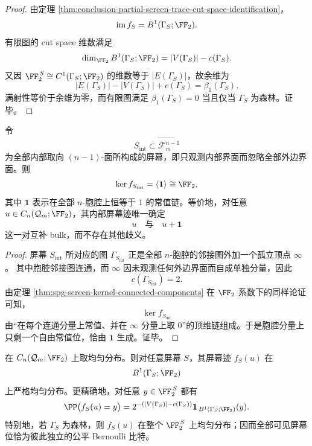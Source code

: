 \begin{proof}
由定理 \ref{thm:conclusion-partial-screen-trace-cut-space-identification}，
\[
\operatorname{im}f_S=B^1(\Gamma_S;\FF_2).
\]
有限图的 cut space 维数满足
\[
\dim_{\FF_2}B^1(\Gamma_S;\FF_2)=|V(\Gamma_S)|-c(\Gamma_S).
\]
又因 \(\FF_2^{\,S}\cong C^1(\Gamma_S;\FF_2)\) 的维数等于 \(|E(\Gamma_S)|\)，故余维为
\[
|E(\Gamma_S)|-|V(\Gamma_S)|+c(\Gamma_S)=\beta_1(\Gamma_S).
\]
满射性等价于余维为零，而有限图满足 \(\beta_1(\Gamma_S)=0\) 当且仅当 \(\Gamma_S\) 为森林。证毕。
\end{proof}

\begin{theorem}\label{thm:conclusion-full-internal-screen-global-complement-law}
令
\[
S_{\mathrm{int}}\subset \overrightarrow{\mathcal F_m^{n-1}}
\]
为全部内部取向 \((n-1)\)-面所构成的屏幕，即只观测内部界面而忽略全部外边界面。则
\[
\ker f_{S_{\mathrm{int}}}
=
\langle \mathbf 1\rangle
\cong
\FF_2,
\]
其中 \(\mathbf 1\) 表示在全部 \(n\)-胞腔上恒等于 \(1\) 的常值链。等价地，对任意 \(u\in C_n(\mathcal Q_m;\FF_2)\)，其内部屏幕迹唯一确定
\[
u
\quad\text{与}\quad
u+\mathbf 1
\]
这一对互补 bulk，而不存在其他歧义。
\end{theorem}

\begin{proof}
屏幕 \(S_{\mathrm{int}}\) 所对应的图 \(\Gamma_{S_{\mathrm{int}}}\) 正是全部 \(n\)-胞腔的邻接图外加一个孤立顶点 \(\infty\)。
其中胞腔邻接图连通，而 \(\infty\) 因未观测任何外边界面而自成单独分量，因此
\[
c(\Gamma_{S_{\mathrm{int}}})=2.
\]
由定理 \ref{thm:spg-screen-kernel-connected-components} 在 \(\FF_2\) 系数下的同样论证可知，
\[
\ker f_{S_{\mathrm{int}}}
\]
由“在每个连通分量上常值、并在 \(\infty\) 分量上取 \(0\)”的顶维链组成。于是胞腔分量上只剩一个自由常值位，恰由 \(\mathbf 1\) 生成。证毕。
\end{proof}

\begin{theorem}\label{thm:conclusion-uniform-bulk-cut-space-uniformization}
在 \(C_n(\mathcal Q_m;\FF_2)\) 上取均匀分布。则对任意屏幕 \(S\)，其屏幕迹 \(f_S(u)\) 在
\[
B^1(\Gamma_S;\FF_2)
\]
上严格均匀分布。更精确地，对任意 \(y\in \FF_2^{\,S}\) 都有
\[
\PP\bigl(f_S(u)=y\bigr)
=
2^{-(|V(\Gamma_S)|-c(\Gamma_S))}
\mathbf 1_{\,B^1(\Gamma_S;\FF_2)}(y).
\]
特别地，若 \(\Gamma_S\) 为森林，则 \(f_S(u)\) 在整个 \(\FF_2^{\,S}\) 上均匀分布；因而全部可见屏幕位恰为彼此独立的公平 Bernoulli 比特。
\end{theorem}

